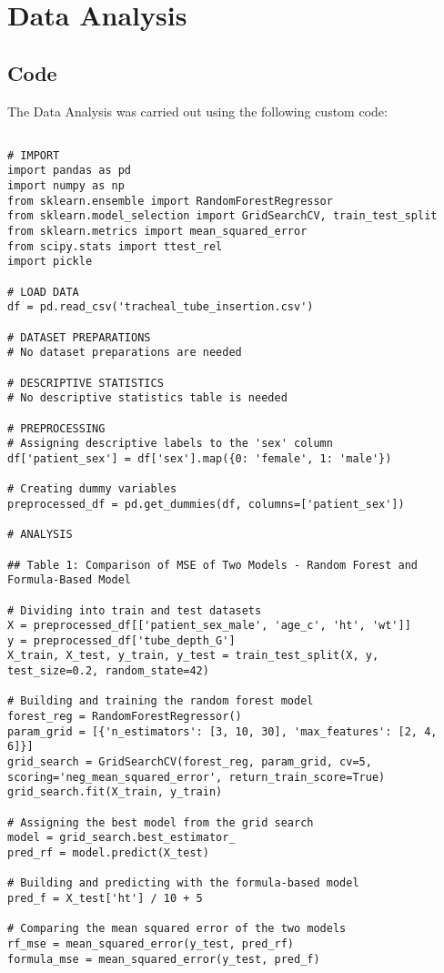 \documentclass[11pt]{article}
\begin{document}
\section{Data Analysis}
\subsection{{Code}}
The Data Analysis was carried out using the following custom code:

\begin{verbatim}

# IMPORT
import pandas as pd
import numpy as np
from sklearn.ensemble import RandomForestRegressor
from sklearn.model_selection import GridSearchCV, train_test_split
from sklearn.metrics import mean_squared_error
from scipy.stats import ttest_rel
import pickle

# LOAD DATA
df = pd.read_csv('tracheal_tube_insertion.csv')

# DATASET PREPARATIONS
# No dataset preparations are needed

# DESCRIPTIVE STATISTICS
# No descriptive statistics table is needed

# PREPROCESSING
# Assigning descriptive labels to the 'sex' column
df['patient_sex'] = df['sex'].map({0: 'female', 1: 'male'})

# Creating dummy variables
preprocessed_df = pd.get_dummies(df, columns=['patient_sex'])

# ANALYSIS

## Table 1: Comparison of MSE of Two Models - Random Forest and Formula-Based Model

# Dividing into train and test datasets
X = preprocessed_df[['patient_sex_male', 'age_c', 'ht', 'wt']]
y = preprocessed_df['tube_depth_G']
X_train, X_test, y_train, y_test = train_test_split(X, y, test_size=0.2, random_state=42)

# Building and training the random forest model
forest_reg = RandomForestRegressor()
param_grid = [{'n_estimators': [3, 10, 30], 'max_features': [2, 4, 6]}]
grid_search = GridSearchCV(forest_reg, param_grid, cv=5, scoring='neg_mean_squared_error', return_train_score=True)
grid_search.fit(X_train, y_train)

# Assigning the best model from the grid search
model = grid_search.best_estimator_
pred_rf = model.predict(X_test)

# Building and predicting with the formula-based model
pred_f = X_test['ht'] / 10 + 5

# Comparing the mean squared error of the two models
rf_mse = mean_squared_error(y_test, pred_rf)
formula_mse = mean_squared_error(y_test, pred_f)


\end{verbatim}
\end{document}
